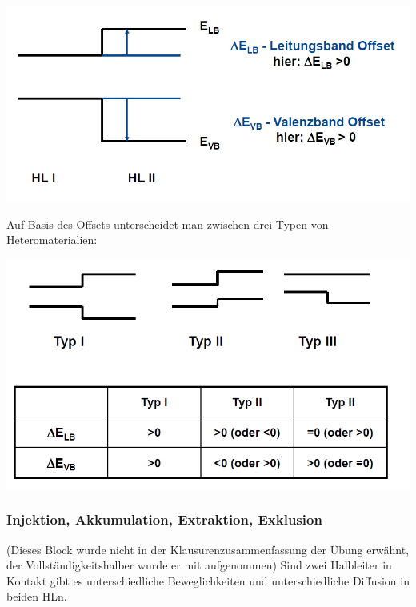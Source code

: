 	\begin{center}			
		\includegraphics[width=0.7\linewidth]{Kapitel/Kap05/Offset.png}
	\end{center}
	
	Auf Basis des Offsets unterscheidet man zwischen drei Typen von Heteromaterialien:
	
	\begin{center}
	\includegraphics[width=0.7\linewidth]{Kapitel/Kap05/TypI-III}
	\end{center}
	
	\subsubsection{Injektion, Akkumulation, Extraktion, Exklusion}
	(Dieses Block wurde nicht in der Klausurenzusammenfassung der Übung erwähnt, der Vollständigkeitshalber wurde er mit aufgenommen)
	\newline
	Sind zwei Halbleiter in Kontakt gibt es unterschiedliche Beweglichkeiten und unterschiedliche Diffusion in beiden HLn.
	
